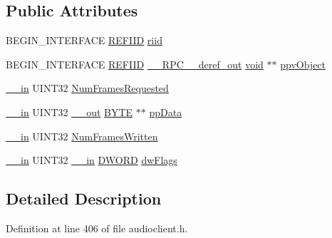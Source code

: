\subsection*{Public Attributes}
\begin{DoxyCompactItemize}
\item 
B\+E\+G\+I\+N\+\_\+\+I\+N\+T\+E\+R\+F\+A\+CE \hyperlink{px__win__ds_8c_a80ec49c8ae61e234197d5071d2df497d}{R\+E\+F\+I\+ID} \hyperlink{struct_i_audio_render_client_vtbl_ac7a3b16f458323acde4d00ab613aa158}{riid}
\item 
B\+E\+G\+I\+N\+\_\+\+I\+N\+T\+E\+R\+F\+A\+CE \hyperlink{px__win__ds_8c_a80ec49c8ae61e234197d5071d2df497d}{R\+E\+F\+I\+ID} \hyperlink{rpcsal_8h_a23bc188526f10656f9c79d950f6c3192}{\+\_\+\+\_\+\+R\+P\+C\+\_\+\+\_\+deref\+\_\+out} \hyperlink{sound_8c_ae35f5844602719cf66324f4de2a658b3}{void} $\ast$$\ast$ \hyperlink{struct_i_audio_render_client_vtbl_af8c00fd1e916873b122146d7c592da09}{ppv\+Object}
\item 
\hyperlink{sal_8h_a3f6b8655e1aa9dfc15a9029f0343009e}{\+\_\+\+\_\+in} U\+I\+N\+T32 \hyperlink{struct_i_audio_render_client_vtbl_afd9e82dcd5c05fbb72b34fdabb624910}{Num\+Frames\+Requested}
\item 
\hyperlink{sal_8h_a3f6b8655e1aa9dfc15a9029f0343009e}{\+\_\+\+\_\+in} U\+I\+N\+T32 \hyperlink{sal_8h_abb4c3c1135aab6c47cff22e7c16efb74}{\+\_\+\+\_\+out} \hyperlink{mapinls_8h_a4ae1dab0fb4b072a66584546209e7d58}{B\+Y\+TE} $\ast$$\ast$ \hyperlink{struct_i_audio_render_client_vtbl_a50063af1e9bd8c7528f180f3fe00afbb}{pp\+Data}
\item 
\hyperlink{sal_8h_a3f6b8655e1aa9dfc15a9029f0343009e}{\+\_\+\+\_\+in} U\+I\+N\+T32 \hyperlink{struct_i_audio_render_client_vtbl_ae9ddd5d44bae4c0b873e4d2bc2e8c357}{Num\+Frames\+Written}
\item 
\hyperlink{sal_8h_a3f6b8655e1aa9dfc15a9029f0343009e}{\+\_\+\+\_\+in} U\+I\+N\+T32 \hyperlink{sal_8h_a3f6b8655e1aa9dfc15a9029f0343009e}{\+\_\+\+\_\+in} \hyperlink{mapinls_8h_ad342ac907eb044443153a22f964bf0af}{D\+W\+O\+RD} \hyperlink{struct_i_audio_render_client_vtbl_acc37ce168c6676a42e89ca35de6472e5}{dw\+Flags}
\end{DoxyCompactItemize}


\subsection{Detailed Description}


Definition at line 406 of file audioclient.\+h.



